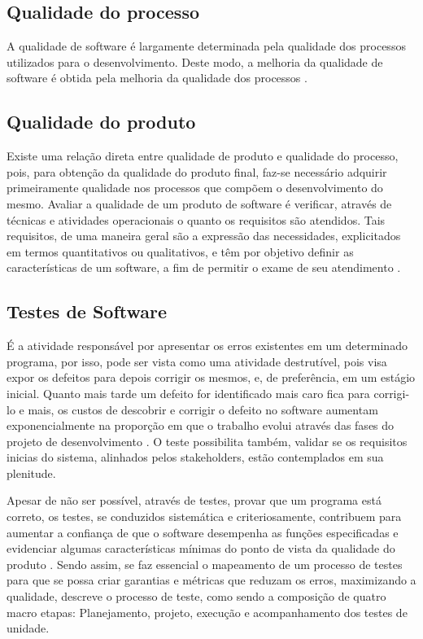 \documentclass[12pt]{article}
\begin{document}
	
	\subsection{Qualidade do processo}
	
	A qualidade de software é largamente determinada pela qualidade dos processos utilizados para o desenvolvimento. Deste modo, a melhoria 
	da qualidade de software é obtida pela melhoria da qualidade dos processos \cite{koscianski2007qualidade}. 
	
	\subsection{Qualidade do produto}

	Existe uma relação direta entre qualidade de produto e qualidade do processo, pois, para obtenção da qualidade do produto final,
	faz-se necessário adquirir primeiramente qualidade nos processos que compõem o desenvolvimento do mesmo.
	Avaliar a qualidade de um produto de software é verificar, através de técnicas e atividades operacionais o quanto os requisitos são atendidos. Tais requisitos,
	de uma maneira geral são a expressão das necessidades, explicitados em termos quantitativos ou qualitativos, e têm por objetivo definir as características de
	um software, a fim de permitir o exame de seu atendimento \cite{koscianski2007qualidade}.
	
	\subsection{Testes de Software}

	É a atividade responsável por apresentar os erros existentes em um determinado programa, por isso, pode ser vista como uma atividade destrutível, pois visa expor os defeitos para depois corrigir os mesmos, e, de preferência, em um estágio inicial. Quanto mais tarde um defeito for identificado mais caro fica para corrigi-lo e mais, os custos de descobrir e corrigir o defeito no software aumentam exponencialmente na proporção em que o trabalho evolui através das fases do projeto de desenvolvimento \cite{boehm1976quantitative}. O teste possibilita também, validar se os requisitos inicias do sistema, alinhados pelos stakeholders, estão contemplados em sua plenitude.

	Apesar de não ser possível, através de testes, provar que um programa está correto, os testes, se conduzidos sistemática e criteriosamente, contribuem para aumentar a confiança de que o software desempenha as funções especificadas e evidenciar algumas características mínimas do ponto de vista da qualidade do produto \cite{maldonado2004introduccao}. Sendo assim, se faz essencial o mapeamento de um processo de testes para que se possa criar garantias e métricas que reduzam os erros, maximizando a qualidade, \citeauthor{crespo2004metodologia} \cite{crespo2004metodologia} descreve o processo de teste, como sendo a composição de quatro macro etapas: Planejamento, projeto, execução e acompanhamento dos testes de unidade.
\end{document}
